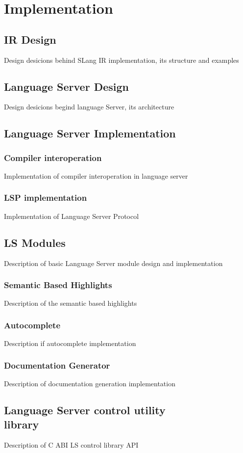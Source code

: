\chapter{Implementation}
\label{chap:impl}

\section{IR Design}
\label{sec:impl:ir_design}
Design desicions behind SLang IR implementation, its structure and examples

\section{Language Server Design}
\label{sec:impl:ls_design}
Design desicions begind language Server, its architecture

\section{Language Server Implementation}
\label{sec:impl:ls_impl}

\subsection{Compiler interoperation}
\label{sec:impl:ls_compiler_interop}
Implementation of compiler interoperation in language server

\subsection{LSP implementation}
Implementation of Language Server Protocol

\section{LS Modules}
\label{sec:impl:ls_mod}
Description of basic Language Server module design and implementation

\subsection{Semantic Based Highlights}
\label{sec:impl:ls_mod:semhighlight}
Description of the semantic based highlights

\subsection{Autocomplete}
\label{sec:impl:ls_mod:autocomplete}
Description if autocomplete implementation

\subsection{Documentation Generator}
\label{sec:impl:ls_mod:docgen}
Description of documentation generation implementation

\section{Language Server control utility\\ library}
\label{sec:impl:ls_control_api}
Description of C ABI LS control library API

